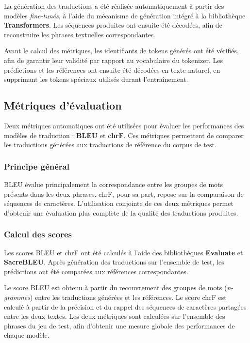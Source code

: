 La génération des traductions a été réalisée automatiquement à partir des modèles \textit{fine-tunés}, à l'aide du mécanisme de génération intégré à la bibliothèque \textbf{Transformers}. Les séquences produites ont ensuite été décodées, afin de reconstruire les phrases textuelles correspondantes.

Avant le calcul des métriques, les identifiants de tokens générés ont été vérifiés, afin de garantir leur validité par rapport au vocabulaire du tokenizer. Les prédictions et les références ont ensuite été décodées en texte naturel, en supprimant les tokens spéciaux utilisés durant l'entraînement.

\subsection{Métriques d'évaluation}
\label{subsec:metriques_evaluation}

Deux métriques automatiques ont été utilisées pour évaluer les performances des modèles de traduction : \textbf{\ac{BLEU}} et \textbf{\ac{chrF}}. Ces métriques permettent de comparer les traductions générées aux traductions de référence du corpus de test.

\subsubsection{Principe général}

\ac{BLEU} évalue principalement la correspondance entre les groupes de mots présents dans les deux phrases. \ac{chrF}, pour sa part, repose sur la comparaison de séquences de caractères. L'utilisation conjointe de ces deux métriques permet d'obtenir une évaluation plus complète de la qualité des traductions produites.

\subsubsection{Calcul des scores}

Les scores \ac{BLEU} et \ac{chrF} ont été calculés à l'aide des bibliothèques \textbf{Evaluate} et \textbf{SacreBLEU}. Après génération des traductions sur l'ensemble de test, les prédictions ont été comparées aux références correspondantes.

Le score \ac{BLEU} est obtenu à partir du recouvrement des groupes de mots (\textit{n-grammes}) entre les traductions générées et les références. Le score \ac{chrF} est calculé à partir de la précision et du rappel des séquences de caractères partagées entre les deux textes. Les deux métriques sont calculées sur l'ensemble des phrases du jeu de test, afin d'obtenir une mesure globale des performances de chaque modèle.

